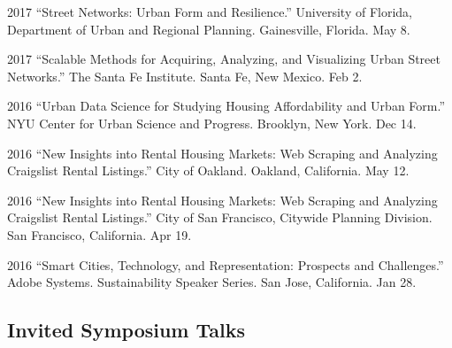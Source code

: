 \documentclass[11pt,letterpaper]{report}
\begin{document}
\begin{tablist}
        \item[2017] \tab{}\enquote{Street Networks: Urban Form and Resilience.} University of Florida, Department of Urban and Regional Planning. Gainesville, Florida. May 8.

        \item[2017] \tab{}\enquote{Scalable Methods for Acquiring, Analyzing, and Visualizing Urban Street Networks.} The Santa Fe Institute. Santa Fe, New Mexico. Feb 2.

        \item[2016] \tab{}\enquote{Urban Data Science for Studying Housing Affordability and Urban Form.} NYU Center for Urban Science and Progress. Brooklyn, New York. Dec 14.

        \item[2016] \tab{}\enquote{New Insights into Rental Housing Markets: Web Scraping and Analyzing Craigslist Rental Listings.} City of Oakland. Oakland, California. May 12.

        \item[2016] \tab{}\enquote{New Insights into Rental Housing Markets: Web Scraping and Analyzing Craigslist Rental Listings.} City of San Francisco, Citywide Planning Division. San Francisco, California. Apr 19.

        \item[2016] \tab{}\enquote{Smart Cities, Technology, and Representation: Prospects and Challenges.} Adobe Systems. Sustainability Speaker Series. San Jose, California. Jan 28.

    \end{tablist}

    \subsection*{Invited Symposium Talks}
\end{document}
